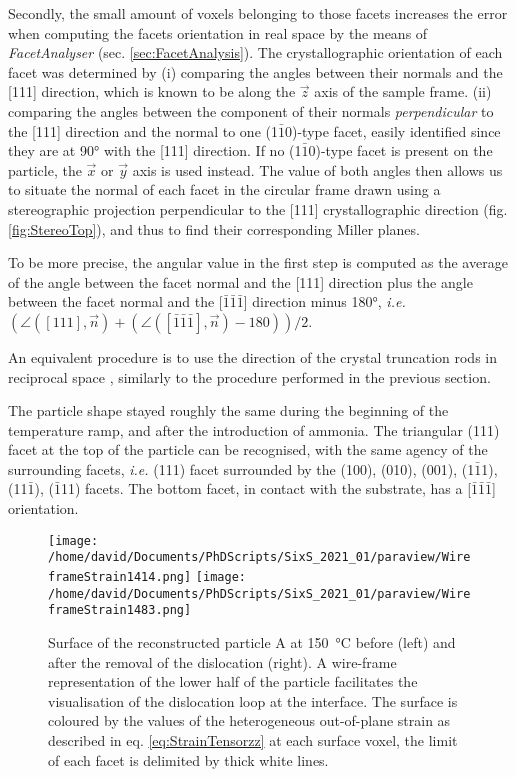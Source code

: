 Secondly, the small amount of voxels belonging to those facets increases the error when computing the facets orientation in real space by the means of \textit{FacetAnalyser} (sec. \ref{sec:FacetAnalysis}).
The crystallographic orientation of each facet was determined by (i) comparing the angles between their normals and the [111] direction, which is known to be along the $\vec{z}$ axis of the sample frame.
(ii) comparing the angles between the component of their normals \textit{perpendicular} to the [111] direction and the normal to one (1$\bar{1}$0)-type facet, easily identified since they are at \ang{90} with the [111] direction.
If no (1$\bar{1}$0)-type facet is present on the particle, the $\vec{x}$ or $\vec{y}$ axis is used instead.
The value of both angles then allows us to situate the normal of each facet in the circular frame drawn using a stereographic projection perpendicular to the [111] crystallographic direction (fig. \ref{fig:StereoTop}), and thus to find their corresponding Miller planes.

To be more precise, the angular value in the first step is computed as the average of the angle between the facet normal and the [111] direction plus the angle between the facet normal and the [$\bar{1}\bar{1}\bar{1}$] direction minus \ang{180}, \textit{i.e.} $(\angle ([111], \vec{n}) + (\angle ([\bar{1}\bar{1}\bar{1}], \vec{n}) -180))/2$.

An equivalent procedure is to use the direction of the crystal truncation rods in reciprocal space \parencite{Richard2018}, similarly to the procedure performed in the previous section.

The particle shape stayed roughly the same during the beginning of the temperature ramp, and after the introduction of ammonia.
The triangular (111) facet at the top of the particle can be recognised, with the same agency of the surrounding facets, \textit{i.e.} (111) facet surrounded by the (100), (010), (001), (1$\bar{1}$1), (11$\bar{1}$), ($\bar{1}$11) facets.
The bottom facet, in contact with the substrate, has a [$\bar{1}\bar{1}\bar{1}$] orientation.

\begin{figure}[!htb]
    \centering
    \texttt{[image: /home/david/Documents/PhDScripts/SixS\_2021\_01/paraview/WireframeStrain1414.png]}
    \texttt{[image: /home/david/Documents/PhDScripts/SixS\_2021\_01/paraview/WireframeStrain1483.png]}
    \caption{
        Surface of the reconstructed particle A at \qty{150}{\degreeCelsius} before (left) and after the removal of the dislocation (right).
        A wire-frame representation of the lower half of the particle facilitates the visualisation of the dislocation loop at the interface.
        The surface is coloured by the values of the heterogeneous out-of-plane strain as described in eq. \ref{eq:StrainTensorzz} at each surface voxel, the limit of each facet is delimited by thick white lines.
    }
    \label{fig:AmaterasuDislocation}
\end{figure}

